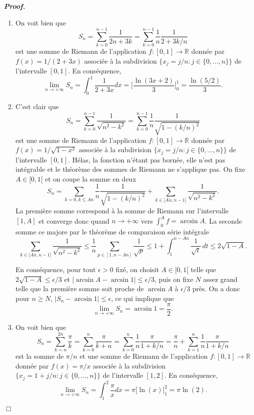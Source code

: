 \documentclass[11pt,a4paper]{article}
\newcommand{\RR}{\mathbb{R}}
\newenvironment{preuve}[1][]
{\vskip 2mm  \noindent\emph{\bf Proof#1. }}{$\Box$ \vskip 2mm}
\let\geq\geqslant
\let\leq\leqslant
\begin{document}
\begin{preuve}
\begin{enumerate}
			\item On voit bien que 
			\[      S_n =\sum_{k=0}^{n-1}\frac{1}{2n+3k} = \sum_{k=0}^{n-1} \frac{1}{n} \frac{1}{2+3k/n}     \]
			est une somme de Riemann de l'application $f : [0,1] \rightarrow \RR$ donnée par $f(x) = 1/(2+3x)$ 
			associée à la subdivision $\{ x_{j} = j/n : j \in \{0, \dots, n\} \}$ de l'intervalle $[0,1]$. 
			En conséquence, 
			\[     \underset{n \rightarrow +\infty}{\lim} S_{n} = \int_{0}^{1} \frac{1}{2+3x} dx = \bigg[ \frac{\ln(3 x + 2)}{3} \bigg]_{0}^{1} = \frac{\ln(5/2)}{3}.     \]
			
			\item C'est clair que 
			\[      S_n =\sum_{k=0}^{n-1}\frac{1}{\sqrt{n^2-k^2}} = \sum_{k=0}^{n-1} \frac{1}{n} \frac{1}{\sqrt{1-(k/n)^2}}     \]
			est une somme de Riemann de l'application $f : [0,1] \rightarrow \RR$ donnée par $f(x) = 1/\sqrt{1-x^{2}}$ 
			associée à la subdivision $\{ x_{j} = j/n : j \in \{0, \dots, n\} \}$ de l'intervalle $[0,1]$. Hélas, la fonction n'étant pas bornée, elle n'est pas intégrable et le théorème des sommes de Riemann ne s'applique pas. On fixe $A\in [0,1[$ et on coupe la somme en deux
			\[      S_n =\sum_{k=0, k\leq An}\frac{1}{n} \frac{1}{\sqrt{1-(k/n)^2}} +  \sum_{k\in ]An,n-1]} \frac{1}{\sqrt{n^2-k^2}}.\]
			La première somme correspond à la somme de Riemann sur l'intervalle $[1,A]$ et converge donc quand $n\to +\infty$ vers $\int_0^Af=\arcsin A$.
			La seconde somme ce majore par le théorème de comparaison série intégrale
			\[
			\sum_{k\in ]An,n-1]} \frac{1}{\sqrt{n^2-k^2}} \leq \frac1{n}\sum_{p\in [1,n-An]}\frac{1}{\sqrt{p}} \leq 1 +\int_1^{n-An}\frac1{\sqrt t}\,dt \leq 2\sqrt{1-A}.
			\]
			
			En conséquence, pour tout $\epsilon>0$ fixé, on choisit $A\in [0,1[$ telle que $2\sqrt{1-A}\leq \epsilon/3$ et $|\arcsin A-\arcsin 1 |\leq \epsilon/3$, puis on fixe $N$ assez grand telle que la première somme soit proche de $\arcsin A$ à  $\epsilon/3$ près. On a donc pour $n\geq N$, $|S_n-\arcsin 1|\leq \epsilon$, ce qui implique que 
			\[     \underset{n \rightarrow +\infty}{\lim} S_{n} = \arcsin1= \frac{\pi}{2}.     \]
			
			\item On voit bien que 
			\[      S_n =\sum_{k=n}^{2n}\frac{\pi}{k} = \sum_{k=0}^{n} \frac{\pi}{k+n} = \sum_{k=0}^{n} \frac{1}{n} \frac{\pi}{1+k/n} = \frac{\pi}{n}+\sum_{k=1}^{n} \frac{1}{n} \frac{\pi}{1+k/n}      \]
			est la somme de $\pi/n$ et une somme de Riemann de l'application $f : [0,1] \rightarrow \RR$ donnée par $f(x) = \pi/x$ 
			associée à la subdivision $\{ x_{j} = 1+ j/n : j \in \{0, \dots, n\} \}$ de l'intervalle $[1,2]$. 
			En conséquence, 
			\[     \underset{n \rightarrow +\infty}{\lim} S_{n} = \int_{1}^{2} \frac{\pi}{x} dx = \pi \bigg[ \ln(x) \bigg]_{1}^{2} = \pi \ln(2).     \]
			

\end{enumerate}
\end{preuve}
\end{document}
